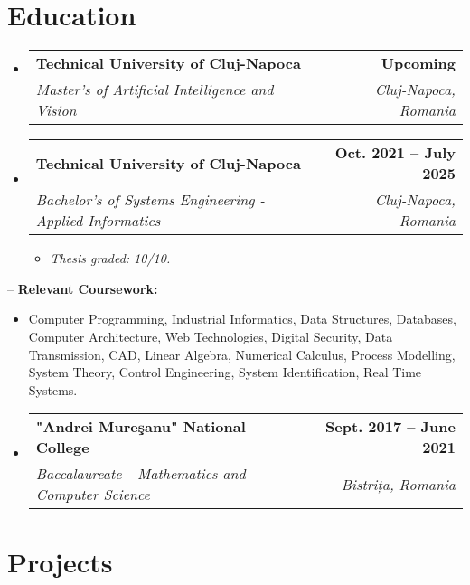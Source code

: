 \documentclass[letterpaper,11pt]{article}
\makeatletter
\newcommand{\resumeItem}[1]{
  \item\small{
    {#1 \vspace{-2pt}}
  }
}
\newcommand{\resumeSubheading}[4]{
  \vspace{-2pt}\item
    \begin{tabular*}{1.0\textwidth}[t]{l@{\extracolsep{\fill}}r}
      \textbf{#1} & \textbf{\small #2} \\
      \textit{\small#3} & \textit{\small #4} \\
    \end{tabular*}\vspace{-7pt}
}
\newcommand{\resumeProjectHeading}[2]{
    \item
    \begin{tabular*}{1.001\textwidth}{l@{\extracolsep{\fill}}r}
      \small#1 & \textbf{\small #2}\\
    \end{tabular*}\vspace{-7pt}
}
\newcommand{\resumeSubHeadingListStart}{\begin{itemize}[leftmargin=0.0in, label={}]}
\newcommand{\resumeSubHeadingListEnd}{\end{itemize}}
\newcommand{\resumeItemListStart}{\begin{itemize}}
\newcommand{\resumeItemListEnd}{\end{itemize}\vspace{-5pt}}
\makeatother
\begin{document}
\section{Education}
  \resumeSubHeadingListStart
    \resumeSubheading
      {Technical University of Cluj-Napoca}{Upcoming}
      {Master's of Artificial Intelligence and Vision}{Cluj-Napoca, Romania}
    \resumeSubheading
      {Technical University of Cluj-Napoca}{Oct. 2021 -- July 2025}
      {Bachelor's of Systems Engineering - Applied Informatics}{Cluj-Napoca, Romania}
      \resumeItemListStart
        \resumeItem{\emph{Thesis graded: 10/10.}}
      \resumeItemListEnd
  \resumeSubHeadingListEnd
  
-- {\textbf{Relevant Coursework:}}
 \resumeItemListStart
        \resumeItem{
 Computer Programming, Industrial Informatics, Data Structures, Databases, Computer Architecture, Web Technologies, Digital Security, Data Transmission, CAD, Linear Algebra, Numerical Calculus, Process Modelling, System Theory, Control Engineering, System Identification, Real Time Systems.}
    \resumeItemListEnd
\resumeSubHeadingListStart
\resumeSubheading
      {"Andrei Mureşanu" National College}{Sept. 2017 -- June 2021}
      {Baccalaureate - Mathematics and Computer Science}{Bistrița, Romania}
  \resumeSubHeadingListEnd  

\section{Projects}

\begin{comment}
    

\vspace{-5pt}
    \resumeSubHeadingListStart
      \resumeProjectHeading
          {\textbf{ Full-Stack E-commerce Website for PC Components} $|$ \emph{ASP .NET Core, React, Vite, Entity Framework}}{Ongoing}
          \resumeItemListStart
          \resumeItem{Leading a team in the development of a full-stack e-commerce platform specializing in PC components. Collaborating closely with team members to optimize website performance and ensure responsive design across various devices.}
            \resumeItem{Spearheading the implementation of user-friendly interfaces to ensure seamless browsing and purchasing experiences.}
            \resumeItem{Overseeing the integration of robust security measures to safeguard user data and transactions.}
    \resumeItemListEnd
    \resumeSubHeadingListEnd
   \end{comment}
\end{document}
